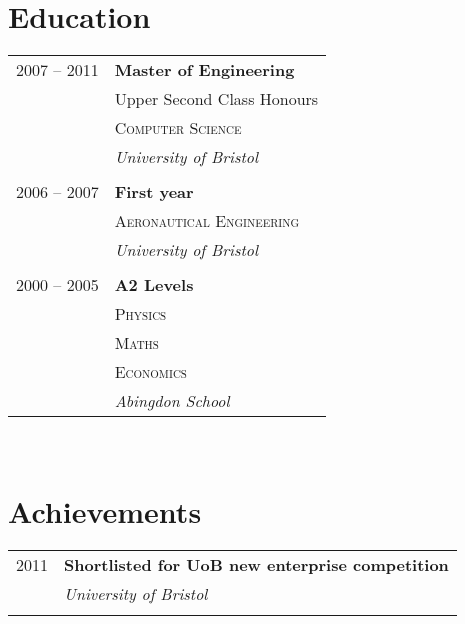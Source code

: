 \documentclass[10pt]{article} %
\begin{document}
{\begin{minipage}[t]{0.44\textwidth}

\section{Education} 

\begin{tabular}{rl} %

2007 -- 2011 & \textbf{Master of Engineering} \\ 
& \small Upper Second Class Honours \\
& \textsc{Computer Science} \\ 
& \textit{University of Bristol}\\
&\\

2006 -- 2007 & \textbf{First year}\\
& \textsc{Aeronautical Engineering} \\
& \textit{University of Bristol}\\
&\\

2000 -- 2005 & \textbf{A2 Levels}\\
& \textsc{Physics} \\
& \textsc{Maths} \\
& \textsc{Economics} \\
& \textit{Abingdon School} 
    

\end{tabular}\\[10pt]


\section{Achievements}

\begin{tabular}{rl}
2011     & \textbf{Shortlisted for UoB new enterprise competition}\\
& \textit{University of Bristol}\\ \\


\end{tabular}
\end{minipage}}
\end{document}
